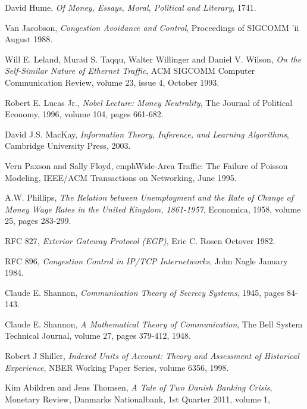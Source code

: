 \begin{thebibliography}{9}
    David Hume,
    \emph{Of Money, Essays, Moral, Political and Literary},
    1741.

    Van Jacobson,
    \emph{Congestion Avoidance and Control},
    Proceedings of SIGCOMM 'ii
    August 1988.

    Will E. Leland, Murad S. Taqqu, Walter Willinger and Daniel V. Wilson,
    \emph{On the Self-Similar Nature of Ethernet Traffic},
    ACM SIGCOMM Computer Communication Review,
    volume 23,
    issue 4,
    October 1993.

    Robert E. Lucas Jr.,
    \emph{Nobel Lecture: Money Neutrality},
    The Journal of Political Economy,
    1996,
    volume 104,
    pages 661-682.


    David J.S. MacKay,
    \emph{Information Theory, Inference, and Learning Algorithms},
    Cambridge University Press,
    2003.

    Vern Paxson and Sally Floyd,
    emph{Wide-Area Traffic: The Failure of Poisson Modeling},
    IEEE/ACM Transactions on Networking,
    June 1995.

    A.W. Phillips,
    \emph{The Relation between Unemployment and the Rate of Change of Money Wage Rates in the United Kingdom, 1861-1957},
    Economica,
    1958,
    volume 25,
    pages 283-299.


    RFC 827,
    \emph{Exterior Gateway Protocol (EGP)},
    Eric C. Rosen
    Octover 1982.

    RFC 896,
    \emph{Congestion Control in IP/TCP Internetworks},
    John Nagle
    January 1984.

    Claude E. Shannon,
    \emph{Communication Theory of Secrecy Systems},
    1945,
    pages 84-143.

    Claude E. Shannon,
    \emph{A Mathematical Theory of Communication},
    The Bell System Technical Journal,
    volume 27,
    pages 379-412,
    1948.

    Robert J Shiller,
    \emph{Indexed Units of Account: Theory and Assessment of Historical Experience},
    NBER Working Paper Series,
    volume 6356,
    1998.

    Kim Abildren and Jens Thomsen,
    \emph{A Tale of Two Danish Banking Crisis},
    Monetary Review,
    Danmarks Nationalbank,
    1st Quarter 2011,
    volume 1,


\end{thebibliography}
